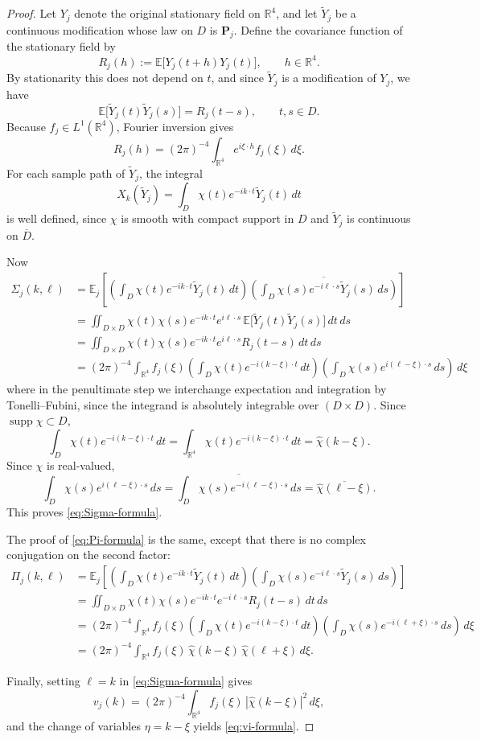 \documentclass[11pt, reqno]{amsart}
\theoremstyle{remark}
\newcommand{\R}{\mathbb{R}}
\newcommand{\E}{\mathbb{E}}
\newcommand{\1}{\mathbf{1}}
\newcommand{\abs}[1]{\left\lvert #1 \right\rvert}
\newcommand{\what}[1]{\widehat{#1}}
\begin{document}
\begin{proof}
Let $Y_j$ denote the original stationary field on $\R^4$, and let $\widetilde Y_j$
be a continuous modification whose law on $D$ is $\mathbf P_j$.
Define the covariance function of the stationary field by
\[
R_j(h):=\E\!\big[Y_j(t+h)Y_j(t)\big], \qquad h\in\R^4.
\]
By stationarity this does not depend on $t$, and since $\widetilde Y_j$ is a
modification of $Y_j$, we have
\[
\E\!\big[\widetilde Y_j(t)\widetilde Y_j(s)\big]=R_j(t-s),
\qquad t,s\in D.
\]
Because $f_j\in L^1(\R^4)$, Fourier inversion gives
\[
R_j(h)=(2\pi)^{-4}\int_{\R^4} e^{i\xi\cdot h}f_j(\xi)\,d\xi.
\]
For each sample path of $\widetilde Y_j$, the integral
\[
X_k(\widetilde Y_j)=\int_D \chi(t)e^{-ik\cdot t}\widetilde Y_j(t)\,dt
\]
is well defined, since $\chi$ is smooth with compact support in $D$ and
$\widetilde Y_j$ is continuous on $\overline D$.

Now
\begin{align*}
\Sigma_j(k,\ell)
&=\E_j\!\left[\left(\int_D \chi(t)e^{-ik\cdot t}\widetilde Y_j(t)\,dt\right)
\overline{\left(\int_D \chi(s)e^{-i\ell\cdot s}\widetilde Y_j(s)\,ds\right)}\right]
\\
&=\iint_{D\times D}
\chi(t)\chi(s)e^{-ik\cdot t}e^{i\ell\cdot s}
\,\E\!\big[\widetilde Y_j(t)\widetilde Y_j(s)\big]\,dt\,ds
\\
&=\iint_{D\times D}
\chi(t)\chi(s)e^{-ik\cdot t}e^{i\ell\cdot s}
R_j(t-s)\,dt\,ds
\\
&=(2\pi)^{-4}\int_{\R^4} f_j(\xi)
\left(\int_D \chi(t)e^{-i(k-\xi)\cdot t}\,dt\right)
\left(\int_D \chi(s)e^{i(\ell-\xi)\cdot s}\,ds\right)\,d\xi
\end{align*}
where in the penultimate step we interchange expectation and integration by Tonelli--Fubini, since the integrand is absolutely integrable over $(D\times D)$.
Since $\operatorname{supp}\chi \subset D$, 
\[
\int_D \chi(t)e^{-i(k-\xi)\cdot t}\,dt
=
\int_{\R^4} \chi(t)e^{-i(k-\xi)\cdot t}\,dt
=
\what\chi(k-\xi).
\]
Since $\chi$ is real-valued,
\[
\int_D \chi(s)e^{i(\ell-\xi)\cdot s}\,ds
=\overline{\int_D \chi(s)e^{-i(\ell-\xi)\cdot s}\,ds}
=\overline{\what\chi(\ell-\xi)}.
\]
This proves \eqref{eq:Sigma-formula}.

The proof of \eqref{eq:Pi-formula} is the same, except that there is no complex
conjugation on the second factor:
\begin{align*}
\Pi_j(k,\ell)
&=\E_j\!\left[\left(\int_D \chi(t)e^{-ik\cdot t}\widetilde Y_j(t)\,dt\right)
\left(\int_D \chi(s)e^{-i\ell\cdot s}\widetilde Y_j(s)\,ds\right)\right]
\\
&=\iint_{D\times D}
\chi(t)\chi(s)e^{-ik\cdot t}e^{-i\ell\cdot s}
R_j(t-s)\,dt\,ds
\\
&=(2\pi)^{-4}\int_{\R^4} f_j(\xi)
\left(\int_D \chi(t)e^{-i(k-\xi)\cdot t}\,dt\right)
\left(\int_D \chi(s)e^{-i(\ell+\xi)\cdot s}\,ds\right)\,d\xi
\\
&=(2\pi)^{-4}\int_{\R^4} f_j(\xi)\,\what\chi(k-\xi)\,\what\chi(\ell+\xi)\,d\xi.
\end{align*}

Finally, setting $\ell=k$ in \eqref{eq:Sigma-formula} gives
\[
v_j(k)=(2\pi)^{-4}\int_{\R^4} f_j(\xi)\,\abs{\what\chi(k-\xi)}^2\,d\xi,
\]
and the change of variables $\eta=k-\xi$ yields \eqref{eq:vi-formula}.
\end{proof}
\end{document}
